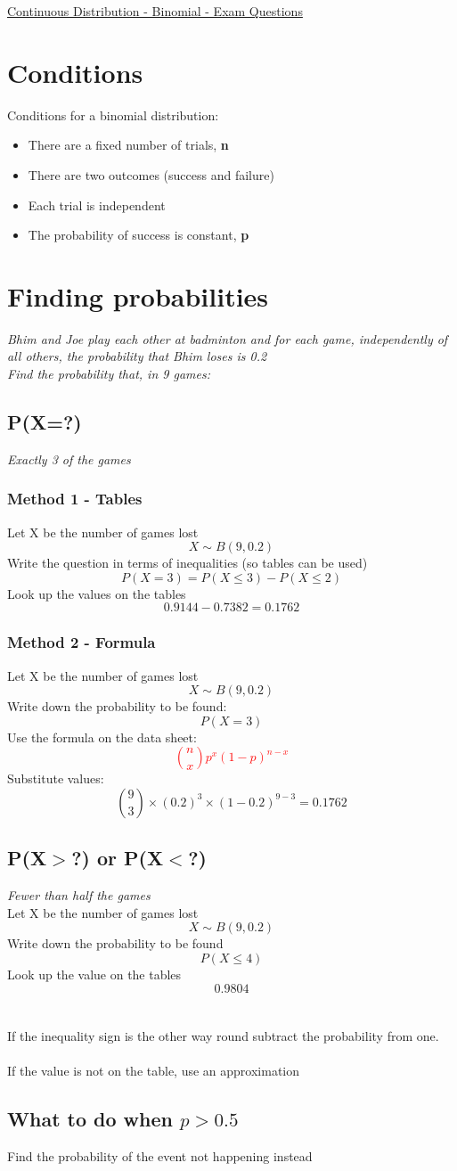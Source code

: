 \documentclass{article}[18pt]
\begin{document}
\begin{center}
\underline{\huge Continuous Distribution - Binomial - Exam Questions}
\end{center}
\section{Conditions}
Conditions for a binomial distribution:
\begin{itemize}
\item There are a fixed number of trials, \textbf{n}
\item There are two outcomes (success and failure)
\item Each trial is independent
\item The probability of success is constant, \textbf{p}
\end{itemize}

\section{Finding probabilities}
\textit{Bhim and Joe play each other at badminton and for each game, independently of all others, the
probability that Bhim loses is 0.2\\
Find the probability that, in 9 games:}
\subsection{P(X=?)}
\textit{Exactly 3 of the games}
\subsubsection{Method 1 - Tables}
Let X be the number of games lost
$$X\sim B(9,0.2)$$
Write the question in terms of inequalities (so tables can be used)
$$P(X=3)=P(X\leqslant3)-P(X\leqslant2)$$
Look up the values on the tables
$$0.9144-0.7382=0.1762$$
\subsubsection{Method 2 - Formula}
Let X be the number of games lost
$$X\sim B(9,0.2)$$
Write down the probability to be found:
$$P(X=3)$$
Use the formula on the data sheet:
\textcolor{red}{$$\binom{n}{x}p^x(1-p)^{n-x}$$}
Substitute values:
$$\binom{9}{3}\times(0.2)^3\times(1-0.2)^{9-3}=0.1762$$
\subsection{P(X$>$?) or P(X$<$?)}
\textit{Fewer than half the games}\\
Let X be the number of games lost
$$X\sim B(9,0.2)$$
Write down the probability to be found
$$P(X\leqslant4)$$
Look up the value on the tables
$$0.9804$$
\\
\\
If the inequality sign is the other way round subtract the probability from one.\\
\\
If the value is not on the table, use an approximation
\subsection{What to do when $p>0.5$}
Find the probability of the event not happening instead
\end{document}
